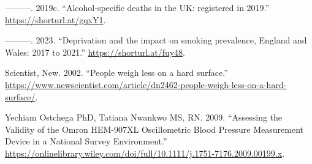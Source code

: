 \documentclass[
  11pt,
  twocolumn]{article}
\newlength{\cslhangindent}
\newlength{\cslentryspacingunit} %
\newenvironment{CSLReferences}[2] %
 {%
  \setlength{\parindent}{0pt}
  \ifodd #1
  \let\oldpar\par
  \def\par{\hangindent=\cslhangindent\oldpar}
  \fi
  \setlength{\parskip}{#2\cslentryspacingunit}
 }%
 {}
\begin{document}
\begin{CSLReferences}{1}{0}
\leavevmode{}%
---------. 2019c. {``{Alcohol-specific deaths in the UK: registered in
2019}.''} \url{https://shorturl.at/gqxY1}.

\leavevmode{}%
---------. 2023. {``{Deprivation and the impact on smoking prevalence,
England and Wales: 2017 to 2021}.''} \url{https://shorturl.at/fuy48}.

\leavevmode{}%
Scientist, New. 2002. {``{People weigh less on a hard surface}.''}
\url{https://www.newscientist.com/article/dn2462-people-weigh-less-on-a-hard-surface/}.

\leavevmode{}%
Yechiam Ostchega PhD, Tatiana Nwankwo MS, RN. 2009. {``{Assessing the
Validity of the Omron HEM-907XL Oscillometric Blood Pressure Measurement
Device in a National Survey Environment}.''}
\url{https://onlinelibrary.wiley.com/doi/full/10.1111/j.1751-7176.2009.00199.x}.

\end{CSLReferences}
\end{document}
